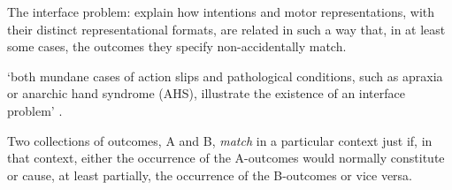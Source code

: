 \documentclass[12pt]{extarticle}
\begin{document}
\begin{multicols*}{3}
The interface problem: explain how intentions and motor representations, with their distinct
representational formats, are related in such a way that, in at least some cases, the outcomes they
specify non-accidentally match.

‘both mundane cases of action slips and pathological conditions, such as apraxia or anarchic hand
syndrome (AHS), illustrate the existence of an interface problem’
\citep[p.~7]{mylopoulos:2016_intentions}.

Two collections of outcomes, A and B, \emph{match} in a particular context just if, in that context,
either the occurrence of the A-outcomes would normally constitute or cause, at least partially, the
occurrence of the B-outcomes or vice versa. 





\vfill



\footnotesize


\end{multicols*}
\end{document}
